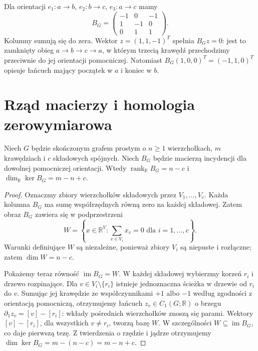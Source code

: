 \begin{przyklad}
Dla orientacji $e_1:a\to b$, $e_2:b\to c$, $e_3:a\to c$ mamy
\[
B_G=\begin{pmatrix}-1&0&-1\\1&-1&0\\0&1&1\end{pmatrix}.
\]
Kolumny sumują się do zera. Wektor $z=(1,1,-1)^T$ spełnia
$B_Gz=0$: jest to zamknięty obieg $a\to b\to c\to a$, w którym
trzecią krawędź przechodzimy przeciwnie do jej orientacji pomocniczej.
Natomiast $B_G(1,0,0)^T=(-1,1,0)^T$ opisuje łańcuch mający początek
w $a$ i koniec w $b$.
\end{przyklad}

\section{Rząd macierzy i homologia zerowymiarowa}
\label{sec:tg-rank-incidence}

\begin{twierdzenie}
\label{thm:tg-rank}
Niech $G$ będzie skończonym grafem prostym o $n\ge1$ wierzchołkach,
$m$ krawędziach i $c$ składowych spójnych. Niech $B_G$ będzie
macierzą incydencji dla dowolnej pomocniczej orientacji. Wtedy
$\operatorname{rank}_{\mathbb R}B_G=n-c$ i
$\dim_{\mathbb R}\ker B_G=m-n+c$.
\end{twierdzenie}

\begin{proof}
Oznaczmy zbiory wierzchołków składowych przez $V_1,\ldots,V_c$.
Każda kolumna $B_G$ ma sumę współrzędnych równą zero na każdej
składowej. Zatem obraz $B_G$ zawiera się w podprzestrzeni
\[
W=\left\{x\in\mathbb R^V:\sum_{v\in V_i}x_v=0
\text{ dla }i=1,\ldots,c\right\}.
\]
Warunki definiujące $W$ są niezależne, ponieważ zbiory $V_i$ są
niepuste i rozłączne; zatem $\dim W=n-c$.

Pokażemy teraz równość $\operatorname{im}B_G=W$.
W każdej składowej wybierzmy korzeń $r_i$ i drzewo rozpinające.
Dla $v\in V_i\setminus\{r_i\}$ istnieje jednoznaczna ścieżka
w drzewie od $r_i$ do $v$. Sumując jej krawędzie ze współczynnikami
$+1$ albo $-1$ według zgodności z orientacją pomocniczą, otrzymujemy
łańcuch $z_v\in C_1(G;\mathbb R)$ o brzegu
$\partial_1z_v=[v]-[r_i]$: wkłady pośrednich wierzchołków znoszą się
parami. Wektory $[v]-[r_i]$, dla wszystkich $v\ne r_i$, tworzą bazę
$W$. W szczególności $W\subseteq\operatorname{im}B_G$, co daje
pierwszą tezę. Z twierdzenia o rzędzie i jądrze otrzymujemy
$\dim\ker B_G=m-(n-c)=m-n+c$.
\end{proof}

